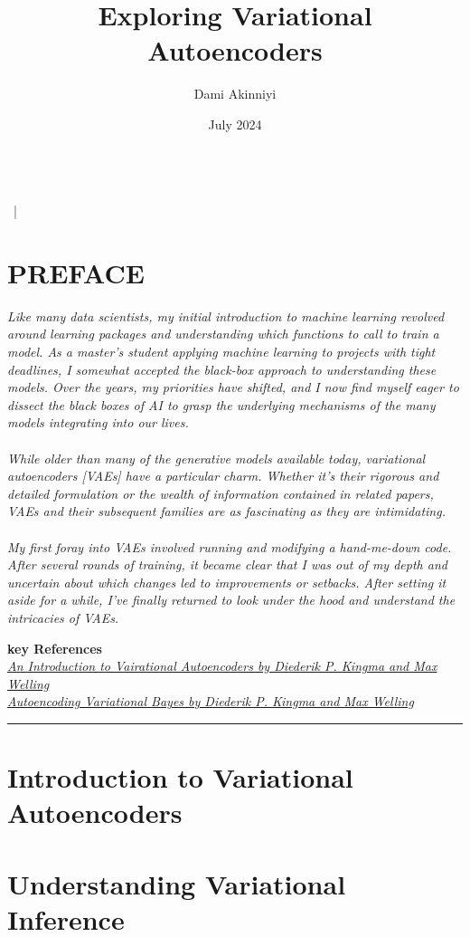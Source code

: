 \documentclass[9pt, a4paper]{article}
\makeatletter
\renewcommand{\maketitle}{\bgroup\setlength{\parindent}{0pt} %
\begin{flushleft}
  \textbf{\@title}\\
  \@author~|~\@date
\end{flushleft}\egroup
}
\makeatother
\begin{document}
\author{Dami Akinniyi}
\title{\Large Exploring Variational Autoencoders}
\date{July 2024}
\maketitle

\setlength{\parindent}{0pt}

\section*{PREFACE}
\indent \textit{Like many data scientists, my initial introduction to machine learning revolved around 
learning packages and understanding which functions to call to train a model. As a master's student 
applying machine learning to projects with tight deadlines, I somewhat accepted the black-box approach 
to understanding these models. Over the years, my priorities have shifted, and I now find myself eager 
to dissect the black boxes of AI to grasp the underlying mechanisms of the many models integrating into our 
lives.\\ \\
While older than many of the generative models available today, variational autoencoders [VAEs] have a 
particular charm. Whether it's their rigorous and detailed formulation or the wealth of information 
contained in related papers, VAEs and their subsequent families are as fascinating as they are 
intimidating. \\ \\
My first foray into VAEs involved running and modifying a hand-me-down code. After several rounds of 
training, it became clear that I was out of my depth and uncertain about which changes led to improvements 
or setbacks. After setting it aside for a while, I've finally returned to look under the hood and 
understand the intricacies of VAEs.\\}

\textbf{key References}\\
\href{https://arxiv.org/pdf/1906.02691}{\textit{An Introduction to Vairational Autoencoders by Diederik P. Kingma and Max Welling}}\\
\href{https://arxiv.org/pdf/1312.6114}{\textit{Autoencoding Variational Bayes by Diederik P. Kingma and Max Welling}}\\
\rule{\linewidth}{0.5pt}
\section{Introduction to Variational Autoencoders}


\section{Understanding Variational Inference}
\end{document}
